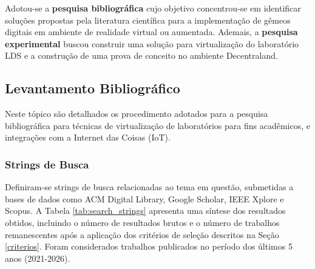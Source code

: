 \documentclass[12pt]{article}
\begin{document}
Adotou-se a \textbf{pesquisa bibliográfica} \cite[p.~39]{gerhardt_silveira} cujo objetivo concentrou-se em identificar soluções propostas pela literatura científica para a implementação de gêmeos digitais em ambiente de realidade virtual ou aumentada. Ademais, a \textbf{pesquisa experimental} \cite[p.~38]{gerhardt_silveira} buscou construir uma solução para virtualização do laboratório LDS e a construção de uma prova de conceito no ambiente Decentraland.

\subsection{Levantamento Bibliográfico}
\label{levantamento}

Neste tópico são detalhados os procedimento adotados para a pesquisa bibliográfica para técnicas de virtualização de laboratórios para fins acadêmicos, e integrações com a Internet das Coisas (IoT).

\subsubsection{Strings de Busca}

Definiram-se strings de busca relacionadas ao tema em questão, submetidas a bases de dados como ACM Digital Library, Google Scholar, IEEE Xplore e Scopus. A Tabela \ref{tab:search_strings} apresenta uma síntese dos resultados obtidos, incluindo o número de resultados brutos e o número de trabalhos remanescentes após a aplicação dos critérios de seleção descritos na Seção \ref{criterios}. Foram considerados trabalhos publicados no período dos últimos 5 anos (2021-2026).
\end{document}
